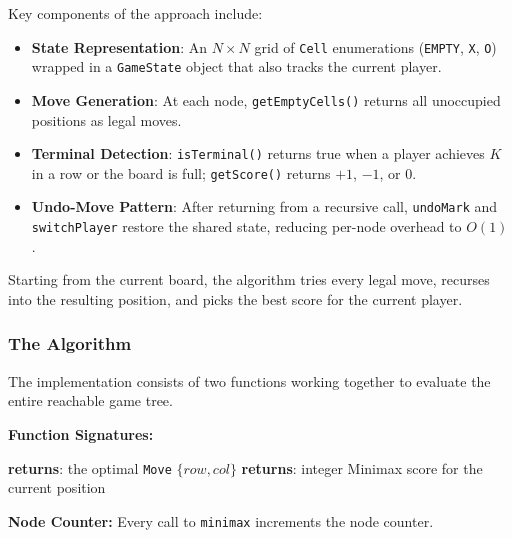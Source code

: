 \documentclass[conference]{IEEEtran}
\begin{document}
Key components of the approach include:
\begin{itemize}
    \item \textbf{State Representation}: An $N \times N$ grid of
    \texttt{Cell} enumerations (\texttt{EMPTY}, \texttt{X}, \texttt{O})
    wrapped in a \texttt{GameState} object that also tracks the current
    player.
    \item \textbf{Move Generation}: At each node,
    \texttt{getEmptyCells()} returns all unoccupied positions as legal
    moves.
    \item \textbf{Terminal Detection}: \texttt{isTerminal()} returns
    true when a player achieves $K$ in a row or the board is full;
    \texttt{getScore()} returns $+1$, $-1$, or $0$.
    \item \textbf{Undo-Move Pattern}: After returning from a recursive
    call, \texttt{undoMark} and \texttt{switchPlayer} restore the shared
    state, reducing per-node overhead to $O(1)$.
\end{itemize}

Starting from the current board, the algorithm tries every legal move,
recurses into the resulting position, and picks the best score for the
current player.

\subsubsection{The Algorithm}
The implementation consists of two functions working together to evaluate
the entire reachable game tree.

\textbf{Function Signatures:}

\begin{algorithm}[htbp]
\caption{Function Signatures (Brute-Force)}
\begin{algorithmic}[1]
\State \textbf{returns}: the optimal \texttt{Move} $\{row, col\}$
\EndProcedure
{}
\State \textbf{returns}: integer Minimax score for the current position
\EndProcedure
\end{algorithmic}
\end{algorithm}

\textbf{Node Counter:}
Every call to \texttt{minimax} increments the node counter.
\end{document}
